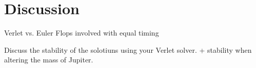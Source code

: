 \documentclass[../main.tex]{subfiles}
\begin{document}
\section{Discussion}\label{results}

Verlet vs. Euler
Flops involved with equal timing

Discuss the stability of the solotiuns using your Verlet solver.  + stability when altering the mass of Jupiter.
\end{document}
